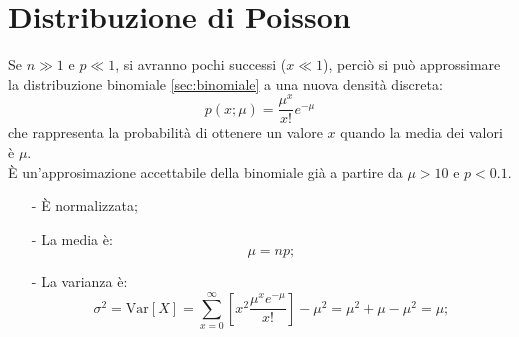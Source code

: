 \section{Distribuzione di Poisson} %
\label{sec:poisson}
Se $n\gg 1$ e $p\ll 1$, si avranno pochi successi ($x\ll 1$), perciò si può approssimare la distribuzione binomiale \ref{sec:binomiale} a una nuova densità discreta:
\begin{equation}
p(x;\mu )=\frac { { \mu  }^{ x } }{ x! } { e }^{ -\mu  }
\end{equation}
che rappresenta la probabilità di ottenere un valore $x$ quando la media dei valori è $\mu$. \\ \`E un'approsimazione accettabile della binomiale già a partire da $\mu >10$ e $p<0.1$.
\begin{itemize}
\item[-] \`E normalizzata;
\item[-] La media è:
\begin{equation} 
\mu =np;
\end{equation}
\item[-] La varianza è:
\begin{equation}
{ \sigma  }^{ 2 }=\textrm{Var}\left[ X \right] =\sum _{ x=0 }^{ \infty  }{ \left[ { x }^{ 2 }\frac { { \mu  }^{ x }{ e }^{ -\mu  } }{ x! }  \right]  } -{ \mu  }^{ 2 }={ \mu  }^{ 2 }+\mu -{ \mu  }^{ 2 }=\mu ;
\end{equation}
\end{itemize}

